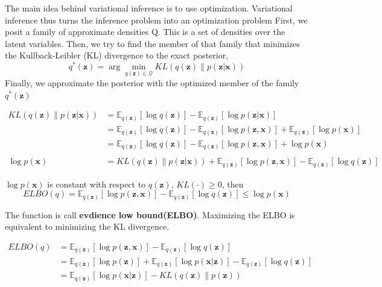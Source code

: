 The main idea behind variational inference is to use optimization. Variational inference thus turns the
inference problem into an optimization problem
First, we posit a family of approximate densities Q. This is a set of densities over the latent
variables. Then, we try to find the member of that family that minimizes the Kullback-Leibler
(KL) divergence to the exact posterior,
\begin{equation}
    q^*(\mathbf{z}) = \arg \min_{q(\mathbf{z}) \in \mathcal{Q}} KL(q(\mathbf{z}) \| p(\mathbf{z}|\mathbf{x}))
\end{equation}
Finally, we approximate the posterior with the optimized member of the family $q^*(\mathbf{z})$

\begin{equation}
    \begin{split}
        KL(q(\mathbf{z})\|p(\mathbf{z}|\mathbf{x}))
        &= \mathbb{E}_{q(\mathbf{z})} [\log q(\mathbf{z})] - \mathbb{E}_{q(\mathbf{z})} [\log p(\mathbf{z}|\mathbf{x})] \\
        &= \mathbb{E}_{q(\mathbf{z})} [\log q(\mathbf{z})] - \mathbb{E}_{q(\mathbf{z})} [\log p(\mathbf{z}, \mathbf{x})] + \mathbb{E}_{q(\mathbf{z})}[\log p(\mathbf{x})]\\
        &= \mathbb{E}_{q(\mathbf{z})} [\log q(\mathbf{z})] - \mathbb{E}_{q(\mathbf{z})} [\log p(\mathbf{z}, \mathbf{x})] + \log p(\mathbf{x}) \\
        \\
        \log p(\mathbf{x})
        &= KL(q(\mathbf{z})\|p(\mathbf{z}|\mathbf{x})) + \mathbb{E}_{q(\mathbf{z})} [\log p(\mathbf{z}, \mathbf{x})] - \mathbb{E}_{q(\mathbf{z})} [\log q(\mathbf{z})]
    \end{split}
\end{equation}

$\log p(\mathbf{x})$ is constant with respect to $q(\mathbf{z})$, $KL(\cdot ) \ge 0$, then
\begin{equation}
    ELBO(q) = \mathbb{E}_{q(\mathbf{z})} [\log p(\mathbf{z}, \mathbf{x})] - \mathbb{E}_{q(\mathbf{z})} [\log q(\mathbf{z})]\le \log p(\mathbf{x})
\end{equation}

The function is call \textbf{evdience low bound(ELBO)}. Maximizing the ELBO is equivalent to
minimizing the KL divergence.

\begin{equation}
    \begin{split}
        ELBO(q)
        &= \mathbb{E}_{q(\mathbf{z})} [\log p(\mathbf{z}, \mathbf{x})] - \mathbb{E}_{q(\mathbf{z})} [\log q(\mathbf{z})] \\
        &= \mathbb{E}_{q(\mathbf{z})} [\log p(\mathbf{z})] + \mathbb{E}_{q(\mathbf{z})} [\log p(\mathbf{x}|\mathbf{z})] - \mathbb{E}_{q(\mathbf{z})} [\log q(\mathbf{z})] \\
        &= \mathbb{E}_{q(\mathbf{z})} [\log p(\mathbf{x} | \mathbf{z})] - KL(q(\mathbf{z})\|p(\mathbf{z}))
    \end{split}
\end{equation}

